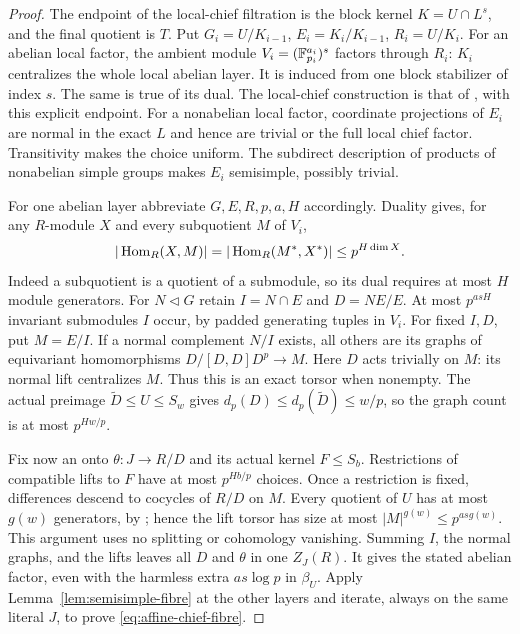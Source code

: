 \begin{proof}
The endpoint of the local-chief filtration is the block kernel
$K=U\cap L^s$, and the final quotient is $T$. Put
$G_i=U/K_{i-1}$, $E_i=K_i/K_{i-1}$, $R_i=U/K_i$.
For an abelian local factor, the ambient module
$V_i=(\mathbb F_{p_i}^{a_i})^s$ factors through $R_i$: $K_i$
centralizes the whole local abelian layer. It is induced from
one block stabilizer of index $s$. The same is true of its dual.
The local-chief construction is that of
\cite[Lemma~5.8]{Tracey2018}, with this explicit endpoint.
For a nonabelian local factor, coordinate projections of $E_i$
are normal in the exact $L$ and hence are trivial or the full local
chief factor. Transitivity makes the choice uniform. The subdirect
description of products of nonabelian simple groups makes $E_i$
semisimple, possibly trivial.

For one abelian layer abbreviate $G,E,R,p,a,H$ accordingly.
Duality gives, for any $R$-module $X$ and every subquotient $M$
of $V_i$,
\[
 |\operatorname{Hom}_R(X,M)|=|\operatorname{Hom}_R(M^*,X^*)|\leq p^{H\dim X}.
\]
Indeed a subquotient is a quotient of a submodule, so its dual
requires at most $H$ module generators. For $N\lhd G$ retain
$I=N\cap E$ and $D=NE/E$. At most $p^{asH}$ invariant
submodules $I$ occur, by padded generating tuples in $V_i$.
For fixed $I,D$, put $M=E/I$. If a normal complement $N/I$
exists, all others are its graphs of equivariant homomorphisms
$D/[D,D]D^p\to M$. Here $D$ acts trivially on $M$: its normal
lift centralizes $M$. Thus this is an exact torsor when nonempty.
The actual preimage $\widetilde D\leq U\leq S_w$ gives
$d_p(D)\leq d_p(\widetilde D)\leq w/p$, so the graph count
is at most $p^{Hw/p}$.

Fix now an onto $\theta:J\to R/D$ and its actual kernel
$F\leq S_b$. Restrictions of compatible lifts to $F$ have at
most $p^{Hb/p}$ choices. Once a restriction is fixed, differences
descend to cocycles of $R/D$ on $M$. Every quotient of $U$ has
at most $g(w)$ generators, by
\cite[Theorem~1.1(1)]{Tracey2018}; hence the lift torsor has
size at most $|M|^{g(w)}\leq p^{as g(w)}$.
This argument uses no splitting or cohomology vanishing.
Summing $I$, the normal graphs, and the lifts leaves all $D$ and
$\theta$ in one $Z_J(R)$. It gives the stated abelian factor,
even with the harmless extra $as\log p$ in $\beta_U$.
Apply Lemma~\ref{lem:semisimple-fibre} at the other layers and
iterate, always on the same literal $J$, to prove
\eqref{eq:affine-chief-fibre}.


\end{proof}

